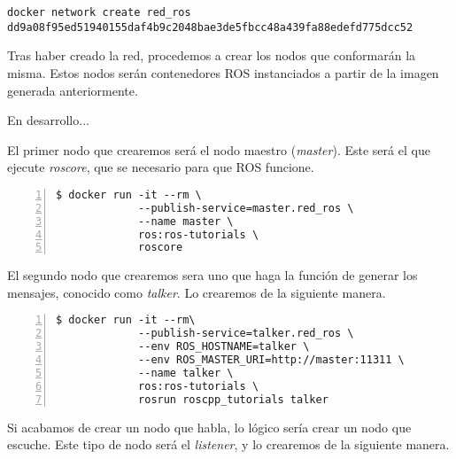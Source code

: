 	\begin{lstlisting}[style=consola]
docker network create red_ros
dd9a08f95ed51940155daf4b9c2048bae3de5fbcc48a439fa88edefd775dcc52
	\end{lstlisting}
	
	Tras haber creado la red, procedemos a crear los nodos que conformarán la misma. Estos nodos serán contenedores ROS instanciados a partir de la imagen generada anteriormente.
	
	En desarrollo...
	
\iffalse
	


	El primer nodo que crearemos será el nodo maestro (\emph{master}). Este será el que ejecute \emph{roscore}, que se necesario para que ROS funcione.

	\begin{lstlisting}[style=consola,numbers=left]
$ docker run -it --rm \
             --publish-service=master.red_ros \
             --name master \
             ros:ros-tutorials \
             roscore
	\end{lstlisting}
	

	El segundo nodo que crearemos sera uno que haga la función de generar los mensajes, conocido como \emph{talker}. Lo crearemos de la siguiente manera.
		
	\begin{lstlisting}[style=consola,numbers=left]
$ docker run -it --rm\
             --publish-service=talker.red_ros \
             --env ROS_HOSTNAME=talker \
             --env ROS_MASTER_URI=http://master:11311 \
             --name talker \
             ros:ros-tutorials \
             rosrun roscpp_tutorials talker
	\end{lstlisting}
	

	Si acabamos de crear un nodo que habla, lo lógico sería crear un nodo que escuche. Este tipo de nodo será el \emph{listener}, y lo crearemos de la siguiente manera.

